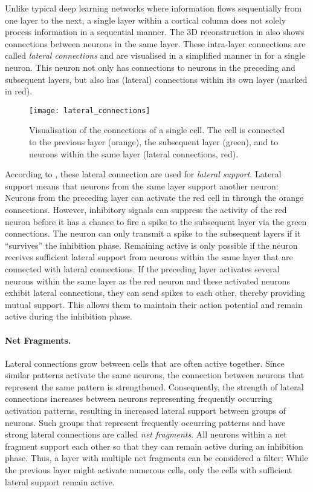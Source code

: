 Unlike typical deep learning networks where information flows sequentially from one layer to the next, a single layer within a cortical column does not solely process information in a sequential manner. The 3D reconstruction in  also shows connections between neurons in the same layer.
These intra-layer connections are called \emph{lateral connections} and are visualised in a simplified manner in  for a single neuron.
This neuron not only has connections to neurons in the preceding and subsequent layers, but also has (lateral) connections within its own layer (marked in red).

\begin{figure}[h]
    \centering
    \texttt{[image: lateral\_connections]}
    \caption[Lateral connections of a cell]{Visualisation of the connections of a single cell. The cell is connected to the previous layer (orange), the subsequent layer (green), and to neurons within the same layer (lateral connections, red).}
\end{figure}

According to , these lateral connection are used for \emph{lateral support}. Lateral support means that neurons from the same layer support another neuron:
Neurons from the preceding layer can activate the red cell in  through the orange connections.
However, inhibitory signals can suppress the activity of the red neuron before it has a chance to fire a spike to the subsequent layer via the green connections. The neuron can only transmit a spike to the subsequent layers if it ``survives'' the inhibition phase. Remaining active is only possible if the neuron receives sufficient lateral support from neurons within the same layer that are connected with lateral connections.
If the preceding layer activates several neurons within the same layer as the red neuron and these activated neurons exhibit lateral connections, they can send spikes to each other, thereby providing mutual support. This allows them to maintain their action potential and remain active during the inhibition phase.

\paragraph{Net Fragments.} Lateral connections grow between cells that are often active together.
Since similar patterns activate the same neurons, the connection between neurons that represent the same pattern is strengthened. 
Consequently, the strength of lateral connections increases between neurons representing frequently occurring activation patterns, resulting in increased lateral support between groups of neurons. Such groups that represent frequently occurring patterns and have strong lateral connections are called \emph{net fragments}.
All neurons within a net fragment support each other so that they can remain active during an inhibition phase. 
Thus, a layer with multiple net fragments can be considered a filter: While the previous layer might activate numerous cells, only the cells with sufficient lateral support remain active.

